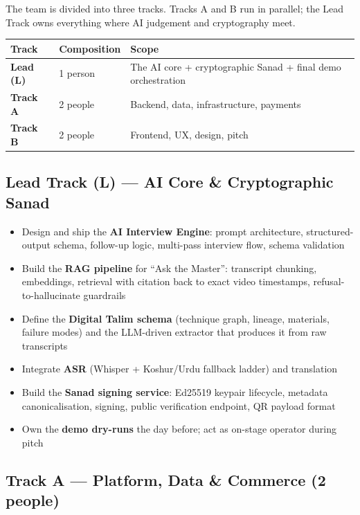 \documentclass[11pt, a4paper]{article}
\begin{document}
The team is divided into three tracks. Tracks A and B run in parallel; the Lead Track owns everything where AI judgement and cryptography meet.

\begin{center}
\small
\begin{tabularx}{\linewidth}{>{\bfseries}lXX}
\toprule
Track & Composition & Scope \\
\midrule
Lead (L) & 1 person & The AI core + cryptographic Sanad + final demo orchestration \\
Track A & 2 people & Backend, data, infrastructure, payments \\
Track B & 2 people & Frontend, UX, design, pitch \\
\bottomrule
\end{tabularx}
\end{center}

\subsection{Lead Track (L) — AI Core \& Cryptographic Sanad}

\begin{itemize}
  \item Design and ship the {\bfseries AI Interview Engine}: prompt architecture, structured-output schema, follow-up logic, multi-pass interview flow, schema validation
  \item Build the {\bfseries RAG pipeline} for ``Ask the Master'': transcript chunking, embeddings, retrieval with citation back to exact video timestamps, refusal-to-hallucinate guardrails
  \item Define the {\bfseries Digital Talim schema} (technique graph, lineage, materials, failure modes) and the LLM-driven extractor that produces it from raw transcripts
  \item Integrate {\bfseries ASR} (Whisper + Koshur/Urdu fallback ladder) and translation
  \item Build the {\bfseries Sanad signing service}: Ed25519 keypair lifecycle, metadata canonicalisation, signing, public verification endpoint, QR payload format
  \item Own the {\bfseries demo dry-runs} the day before; act as on-stage operator during pitch
\end{itemize}

\subsection{Track A — Platform, Data \& Commerce (2 people)}
\end{document}
